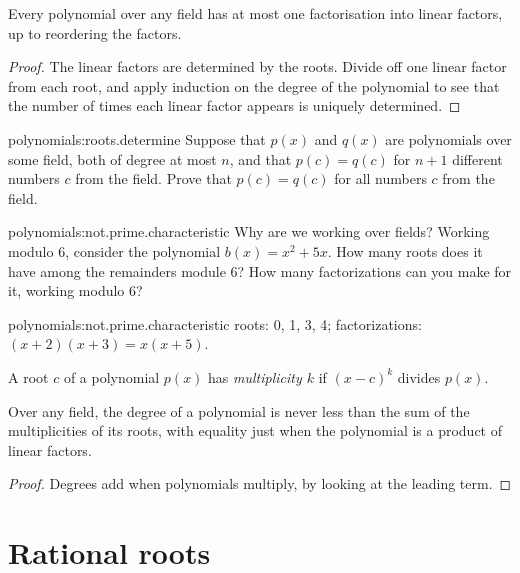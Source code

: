 \begin{corollary}
Every polynomial over any field has at most one factorisation into linear factors, up to reordering the factors.
\end{corollary}
\begin{proof}
The linear factors are determined by the roots.
Divide off one linear factor from each root, and apply induction on the degree of the polynomial to see that the number of times each linear factor appears is uniquely determined.
\end{proof}

\begin{problem}{polynomials:roots.determine}
Suppose that \(p(x)\) and \(q(x)\) are polynomials over some field, both of degree at most \(n\), and that \(p(c)=q(c)\) for \(n+1\) different numbers \(c\) from the field.
Prove that \(p(c)=q(c)\) for all numbers \(c\) from the field.
\end{problem}

\begin{problem}{polynomials:not.prime.characteristic}
Why are we working over fields?
Working modulo \(6\), consider the polynomial \(b(x)=x^2+5x\).
How many roots does it have among the remainders module \(6\)?
How many factorizations can you make for it, working modulo \(6\)?
\end{problem}
\begin{answer}{polynomials:not.prime.characteristic}
roots: 0, 1, 3, 4; factorizations: \((x+2)(x+3)=x(x+5)\).
\end{answer}

A root \(c\) of a polynomial \(p(x)\) has \emph{multiplicity \(k\)} if \((x-c)^k\) divides \(p(x)\).
\begin{corollary}
Over any field, the degree of a polynomial is never less than the sum of the multiplicities of its roots, with equality just when the polynomial is a product of linear factors.
\end{corollary}
\begin{proof}
Degrees add when polynomials multiply, by looking at the leading term.
\end{proof}


\section{Rational roots}

